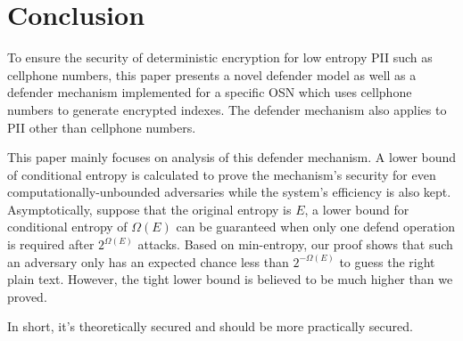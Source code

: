 \documentclass[10pt, conference, compsocconf]{IEEEtran}
\begin{document}



\section{Conclusion}
    To ensure the security of deterministic encryption
    for low entropy PII such as cellphone numbers,
    this paper presents a novel defender model as well
    as a defender mechanism implemented for a specific
    OSN which uses cellphone numbers to generate encrypted indexes.
    The defender mechanism also applies to PII other than
    cellphone numbers.

    This paper mainly focuses on analysis of this defender mechanism.
    A lower bound of conditional entropy is calculated to
    prove the mechanism's security for even
    computationally-unbounded adversaries while
    the system's efficiency is also kept.
    Asymptotically, suppose that the original entropy is $E$,
    a lower bound for conditional entropy of $\Omega(E)$ can be
    guaranteed when only one defend operation is required after
    $2^{\Omega(E)}$ attacks.
    Based on min-entropy, our proof shows that
    such an adversary only has an expected chance
    less than $2^{-\Omega(E)}$ to guess the right plain text.
    However, the tight lower bound 
    is believed to be much higher than we proved.

    In short, it's theoretically secured and should be more practically secured.



%
%


\end{document}
